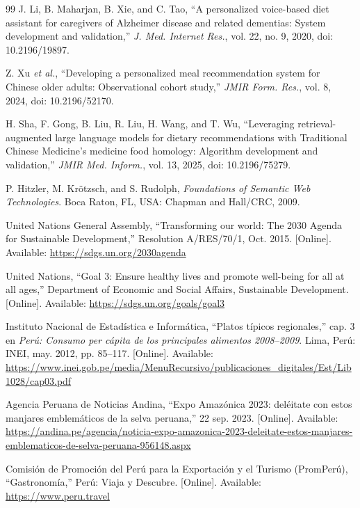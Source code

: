 \documentclass[conference]{IEEEtran}
\begin{document}
\begin{thebibliography}{99}
 J. Li, B. Maharjan, B. Xie, and C. Tao, ``A personalized voice-based diet assistant for caregivers of Alzheimer disease and related dementias: System development and validation,'' \emph{J. Med. Internet Res.}, vol. 22, no. 9, 2020, doi: 10.2196/19897.

 Z. Xu \emph{et al.}, ``Developing a personalized meal recommendation system for Chinese older adults: Observational cohort study,'' \emph{JMIR Form. Res.}, vol. 8, 2024, doi: 10.2196/52170.

 H. Sha, F. Gong, B. Liu, R. Liu, H. Wang, and T. Wu, ``Leveraging retrieval-augmented large language models for dietary recommendations with Traditional Chinese Medicine's medicine food homology: Algorithm development and validation,'' \emph{JMIR Med. Inform.}, vol. 13, 2025, doi: 10.2196/75279.

 P. Hitzler, M. Krötzsch, and S. Rudolph, \emph{Foundations of Semantic Web Technologies}. Boca Raton, FL, USA: Chapman and Hall/CRC, 2009.

 United Nations General Assembly, ``Transforming our world: The 2030 Agenda for Sustainable Development,'' Resolution A/RES/70/1, Oct. 2015. [Online]. Available: \url{https://sdgs.un.org/2030agenda}

 United Nations, ``Goal 3: Ensure healthy lives and promote well-being for all at all ages,'' Department of Economic and Social Affairs, Sustainable Development. [Online]. Available: \url{https://sdgs.un.org/goals/goal3}

 Instituto Nacional de Estadística e Informática, ``Platos típicos regionales,'' cap. 3 en \emph{Perú: Consumo per cápita de los principales alimentos 2008--2009}. Lima, Perú: INEI, may. 2012, pp. 85--117. [Online]. Available: \url{https://www.inei.gob.pe/media/MenuRecursivo/publicaciones_digitales/Est/Lib1028/cap03.pdf}

 Agencia Peruana de Noticias Andina, ``Expo Amazónica 2023: deléitate con estos manjares emblemáticos de la selva peruana,'' 22 sep. 2023. [Online]. Available: \url{https://andina.pe/agencia/noticia-expo-amazonica-2023-deleitate-estos-manjares-emblematicos-de-selva-peruana-956148.aspx}

 Comisión de Promoción del Perú para la Exportación y el Turismo (PromPerú), ``Gastronomía,'' Perú: Viaja y Descubre. [Online]. Available: \url{https://www.peru.travel}


\end{thebibliography}
\end{document}
